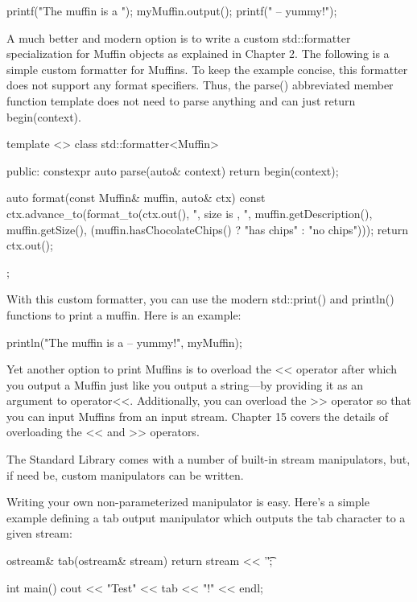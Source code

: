 \begin{cpp}
printf("The muffin is a ");
myMuffin.output();
printf(" -- yummy!\n");
\end{cpp}

A much better and modern option is to write a custom std::formatter specialization for Muffin objects as explained in Chapter 2. The following is a simple custom formatter for Muffins. To keep the example concise, this formatter does not support any format specifiers. Thus, the parse() abbreviated member function template does not need to parse anything and can just return begin(context).

\begin{cpp}
template <>
class std::formatter<Muffin>
{
    public:
    constexpr auto parse(auto& context) { return begin(context); }

    auto format(const Muffin& muffin, auto& ctx) const
    {
        ctx.advance_to(format_to(ctx.out(), "{}, size is {}, {}",
            muffin.getDescription(), muffin.getSize(),
            (muffin.hasChocolateChips() ? "has chips" : "no chips")));
        return ctx.out();
    }
};
\end{cpp}

With this custom formatter, you can use the modern std::print() and println() functions to print a muffin. Here is an example:

\begin{cpp}
println("The muffin is a {} -- yummy!", myMuffin);
\end{cpp}

Yet another option to print Muffins is to overload the <{}< operator after which you output a Muffin just like you output a string—by providing it as an argument to operator<{}<. Additionally, you can overload the >{}> operator so that you can input Muffins from an input stream. Chapter 15 covers the details of overloading the <{}< and >{}> operators.


The Standard Library comes with a number of built-in stream manipulators, but, if need be, custom manipulators can be written.

Writing your own non-parameterized manipulator is easy. Here’s a simple example defining a tab output manipulator which outputs the tab character to a given stream:

\begin{cpp}
ostream& tab(ostream& stream) { return stream << '\t'; }

int main()
{
    cout << "Test" << tab << "!" << endl;
}
\end{cpp}

